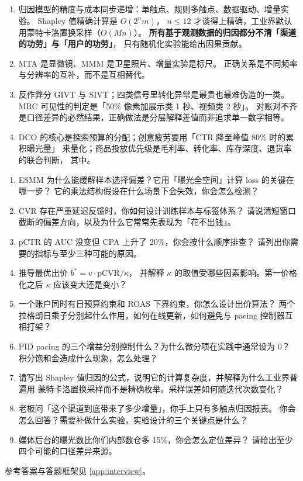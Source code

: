 \begin{keypoint}[本章要点回顾]
\begin{enumerate}
        实践定位应是而非决策层，
        必须配安全包络、双重稳健离线评估与长期 A/B 对照。
  \item 归因模型的精度与成本同步递增：单触点、规则多触点、数据驱动、增量实验。
        Shapley 值精确计算是 $O(2^{n} m)$，
        $n \le 12$ 才谈得上精确，工业界默认用蒙特卡洛置换采样（$O(Mn)$）。
        \textbf{所有基于观测数据的归因都分不清「渠道的功劳」与「用户的功劳」}，
        只有随机化实验能给出因果贡献。
  \item MTA 是显微镜、MMM 是卫星照片、增量实验是标尺。
        正确关系是不同频率与分辨率的互补，而不是互相替代。
  \item 反作弊分 GIVT 与 SIVT；四类信号里转化异常是最贵也最难伪造的一类。
        MRC 可见性的判定是「50\% 像素加展示类 1 秒、视频类 2 秒」。
        对账对不齐是口径差异的必然结果，正确做法是分层解释差值而非追求单一数字相等。
  \item DCO 的核心是探索预算的分配；创意疲劳要用「CTR 降至峰值 80\% 时的累积曝光量」
        来量化；商品投放优先级是毛利率、转化率、库存深度、退货率的联合判断，
        其中。
\end{enumerate}
\end{keypoint}

\begin{interview}[本章对应的面试题]
\begin{enumerate}
  \item ESMM 为什么能缓解样本选择偏差？它用「曝光全空间」计算 loss 的关键在哪一步？
        它的乘法结构假设在什么场景下会失效，你会怎么检测？
  \item CVR 存在严重延迟反馈时，你如何设计训练样本与标签体系？
        请说清短窗口截断的偏差方向，以及为什么它常常先表现为「花不出钱」。
  \item pCTR 的 AUC 没变但 CPA 上升了 20\%，你会按什么顺序排查？
        请列出你需要的指标与至少三种可能的原因。
  \item 推导最优出价 $b^{*} = v \cdot \mathrm{pCVR}/\kappa$，
        并解释 $\kappa$ 的取值受哪些因素影响。第一价格化之后 $\kappa$ 应该变大还是变小？
  \item 一个账户同时有日预算约束和 ROAS 下界约束，你怎么设计出价算法？
        两个拉格朗日乘子分别起什么作用，如何在线更新，如何避免与 pacing 控制器互相打架？
  \item PID pacing 的三个增益分别控制什么？为什么微分项在实践中通常设为 0？
        积分饱和会造成什么现象，怎么处理？
  \item 请写出 Shapley 值归因的公式，说明它的计算复杂度，并解释为什么工业界普遍用
        蒙特卡洛置换采样而不是精确枚举。采样误差如何随迭代次数变化？
  \item 老板问「这个渠道到底带来了多少增量」，你手上只有多触点归因报表。
        你会怎么回答？需要补做什么实验，实验设计的三个关键点是什么？
  \item 媒体后台的曝光数比你们内部数仓多 15\%，你会怎么定位差异？
        请给出至少四个可能的口径差异来源。
\end{enumerate}
参考答案与答题框架见 \cref{app:interview}。
\end{interview}

